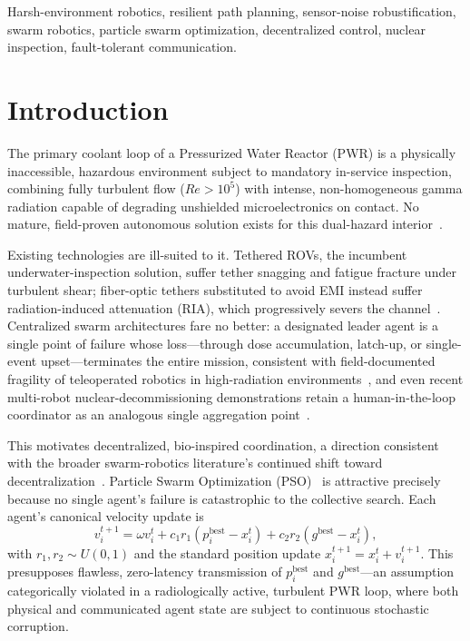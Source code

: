 \documentclass[conference]{IEEEtran}
\begin{document}
\begin{IEEEkeywords}
Harsh-environment robotics, resilient path planning, sensor-noise robustification, swarm robotics, particle swarm optimization, decentralized control, nuclear inspection, fault-tolerant communication.
\end{IEEEkeywords}

\section{Introduction}
\label{sec:intro}

The primary coolant loop of a Pressurized Water Reactor (PWR) is a physically inaccessible, hazardous environment subject to mandatory in-service inspection, combining fully turbulent flow ($Re > 10^5$) with intense, non-homogeneous gamma radiation capable of degrading unshielded microelectronics on contact. No mature, field-proven autonomous solution exists for this dual-hazard interior~\cite{pwr_inspection}.

Existing technologies are ill-suited to it. Tethered ROVs, the incumbent underwater-inspection solution, suffer tether snagging and fatigue fracture under turbulent shear; fiber-optic tethers substituted to avoid EMI instead suffer radiation-induced attenuation (RIA), which progressively severs the channel~\cite{ria_optical}. Centralized swarm architectures fare no better: a designated leader agent is a single point of failure whose loss---through dose accumulation, latch-up, or single-event upset---terminates the entire mission, consistent with field-documented fragility of teleoperated robotics in high-radiation environments~\cite{nagatani_fukushima}, and even recent multi-robot nuclear-decommissioning demonstrations retain a human-in-the-loop coordinator as an analogous single aggregation point~\cite{mitchell_smurf_2023}.

This motivates decentralized, bio-inspired coordination, a direction consistent with the broader swarm-robotics literature's continued shift toward decentralization~\cite{refis_swarm_review_2025}. Particle Swarm Optimization (PSO)~\cite{pso_canonical} is attractive precisely because no single agent's failure is catastrophic to the collective search. Each agent's canonical velocity update is
\begin{equation}
v_i^{t+1} = \omega v_i^{t} + c_1 r_1 \left(p_i^{\text{best}} - x_i^{t}\right) + c_2 r_2 \left(g^{\text{best}} - x_i^{t}\right),
\label{eq:canonical-pso}
\end{equation}
with $r_1, r_2 \sim U(0,1)$ and the standard position update $x_i^{t+1} = x_i^{t} + v_i^{t+1}$. This presupposes flawless, zero-latency transmission of $p_i^{\text{best}}$ and $g^{\text{best}}$---an assumption categorically violated in a radiologically active, turbulent PWR loop, where both physical and communicated agent state are subject to continuous stochastic corruption.
\end{document}
